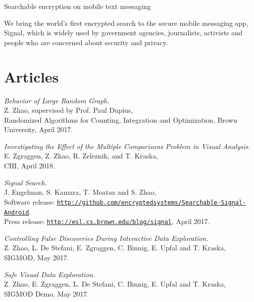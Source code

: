 \documentclass[letterpaper]{article}
\renewenvironment{itemize}{
  \begin{list}{}{
    \setlength{\leftmargin}{1.5em}
  }
}{
  \end{list}
}
\begin{document}
\begin{itemize}
\begin{itemize}
		\end{itemize}
	\item Searchable encryption on mobile text messaging
		\begin{itemize}
			\item We bring the world's first encrypted search to the secure mobile messaging app, Signal, which is widely used by government agencies, journalists, activists and people who are concerned about security and privacy.
		\end{itemize}
\end{itemize}

\section*{Articles}

\begin{itemize}

\item \textit{Behavior of Large Random Graph.}\\
  Z. Zhao, supervised by Prof. Paul Dupius, \\
  Randomized Algorithms for Counting, Integration and Optimization, Brown University, April 2017.

\item \textit{Investigating the Effect of the Multiple Comparisons Problem in Visual Analysis.} \\
  E. Zgraggen, Z. Zhao, R. Zeleznik, and T. Kraska, \\
  CHI, April 2018.

\item \textit{Signal Search.} \\
  J. Engelman, S. Kamara, T. Moataz and S. Zhao, \\
  Software release: \href{http://github.com/encryptedsystems/Searchable-Signal-Android}{\tt http://github.com/encryptedsystems/Searchable-Signal-Android}. \\
  Press release: \href{http://esl.cs.brown.edu/blog/signal}{\tt http://esl.cs.brown.edu/blog/signal}, April 2017.

\item \textit{Controlling False Discoveries During Interactive Data Exploration.} \\
  Z. Zhao, L. De Stefani, E. Zgraggen, C. Binnig, E. Upfal and T. Kraska, \\
  SIGMOD, May 2017.

\item \textit{Safe Visual Data Exploration.} \\
  Z. Zhao, E. Zgraggen, L. De Stefani, C. Binnig, E. Upfal and T. Kraska, \\
  SIGMOD Demo, May 2017.


\end{itemize}
\end{document}
